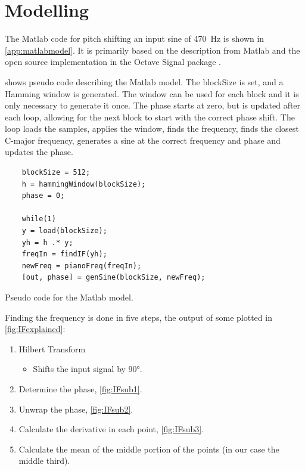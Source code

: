 
\section{Modelling}
\label{sec:PureSineModelling}

The Matlab code for pitch shifting an input sine of \SI{470}{\hertz} is shown in \cref{app:matlabmodel}. It is primarily based on the description from Matlab \cite{MatlabIF} and the open source implementation in the Octave Signal package \cite{OctaveHilbert}.

 shows pseudo code describing the Matlab model.
The blockSize is set, and a Hamming window is generated.
The window can be used for each block and it is only necessary to generate it once.
The phase starts at zero, but is updated after each loop, allowing for the next block to start with the correct phase shift.
The loop loads the samples, applies the window, finds the frequency, finds the closest C-major frequency, generates a sine at the correct frequency and phase and updates the phase.

\begin{listing}
	\begin{verbatim}
	blockSize = 512;
	h = hammingWindow(blockSize);
	phase = 0;
	
	while(1)
	y = load(blockSize);
	yh = h .* y;
	freqIn = findIF(yh);
	newFreq = pianoFreq(freqIn);
	[out, phase] = genSine(blockSize, newFreq);
	\end{verbatim}
	\caption{Pseudo code for the Matlab model.}
	\label{code:matlabmodel}
\end{listing}

Finding the frequency is done in five steps, the output of some plotted in \cref{fig:IFexplained}:
\begin{enumerate}
	\item Hilbert Transform
	\begin{itemize}
		\item Shifts the input signal by \ang{90}.
	\end{itemize}
	\item Determine the phase, \cref{fig:IFsub1}.
	\item Unwrap the phase, \cref{fig:IFsub2}.
	\item Calculate the derivative in each point, \cref{fig:IFsub3}.
	\item Calculate the mean of the middle portion of the points (in our case the middle third).
\end{enumerate}

